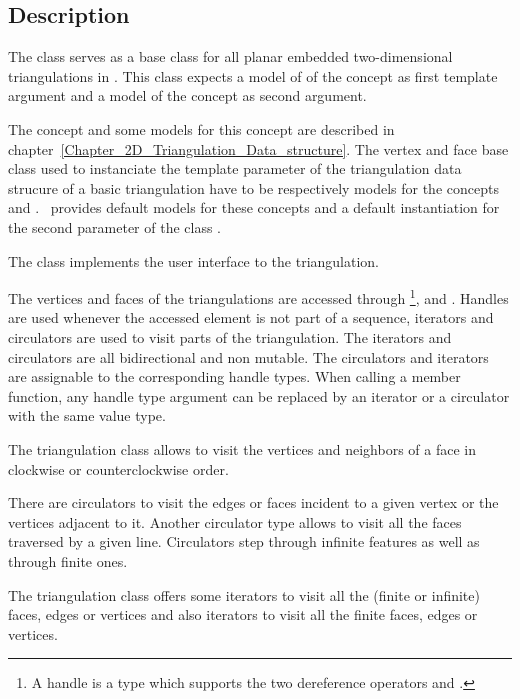 \subsection{Description}
\label{Subsection_2D_Triangulations_Basic_Description}

The class 
serves as a base class for all
planar embedded two-dimensional triangulations
in \cgal.
This class expects a model of  
of the concept  
as first template argument and a model of the concept
as second argument. 

The concept 
 and some models for this concept are
described in chapter~\ref{Chapter_2D_Triangulation_Data_structure}.
The 
vertex and face base class used to instanciate the template parameter
of the triangulation data strucure 
of a basic triangulation
have to be respectively models for the concepts
 and .
\cgal\ provides default models for these concepts
and a default instantiation for the second parameter 
of the class .


The class  implements the user
interface to the triangulation.


The vertices and faces of the triangulations are accessed through 
\footnote{ A handle is a type which supports the two
dereference operators  and .}, 
 and . 
Handles are used whenever the accessed element 
is not part of a sequence,
iterators and circulators are used
to visit parts of the triangulation.
The iterators and circulators
are all bidirectional and non mutable.
The circulators and iterators are assignable to the 
corresponding handle types. 
When calling a member function,
any handle type argument can be replaced
by an iterator or a circulator
with the same value type.

The triangulation class allows to visit the vertices
and  neighbors of a face in clockwise or counterclockwise order. 

There are circulators  
to visit the edges or faces 
incident to a given vertex or the  vertices 
adjacent to it.
Another circulator type allows to visit all the faces
traversed by a given line.
Circulators step through infinite features as well as 
through finite ones. 

The triangulation class offers 
some iterators to visit all the (finite or infinite)
faces, edges or vertices and also iterators to visit all the finite
faces, edges  or vertices.



